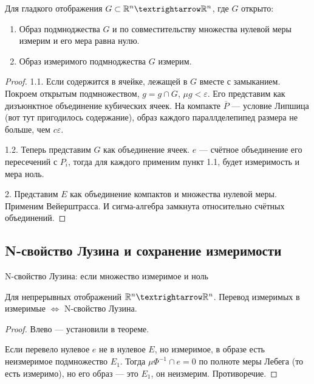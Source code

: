 \documentclass[12pt, a4paper, oneside]{memoir}
\begin{document}
\begin{theorem}

    Для гладкого отображения $G \subset \sR^n → \sR^n$, где $G$ открыто:

    \begin{enumerate}
        \item Образ подмноджества $G$ и по совместительству множества нулевой меры измерим и его мера равна нулю.
        \item Образ измеримого подмноджества $G$ измерим.
    \end{enumerate}

    \begin{proof}
        1.1. Если содержится в ячейке, лежащей в $G$ вместе с замыканием. Покроем открытым подмножеством, $g = g \cap G$,
         $\mu g < \varepsilon$. Его представим как дизъюнктное объединение кубических ячеек.
         На компакте $\overline{P}$ — условие Липшица (вот тут пригодилось содержание), образ каждого параллделепипед размера не больше, чем $c \varepsilon$.

        1.2. Теперь представим $G$ как объединение ячеек. $e$ — счётное объединение его пересечений с $P_i$,
        тогда для каждого применим пункт 1.1, будет измеримость и мера ноль.

        2. Представим $E$ как объединение компактов и множества нулевой меры. Применим Вейерштрасса.
        И сигма-алгебра замкнута относительно счётных объединений.
    \end{proof}
\end{theorem}

\subsection{N-свойство Лузина и сохранение измеримости}

N-свойство Лузина: если множество измеримое и ноль

\begin{theorem}
    Для непрерывных отображений $\sR^n → \sR^n$.
    Перевод измеримых в измеримые $\Leftrightarrow$ N-свойство Лузина.

    \begin{proof}
        Влево — установили в теореме.

        Если перевело нулевое $e$ не в нулевое $E$, но измеримое,
        в образе есть неизмеримое подмножество $E_1$.
        Тогда $\mu \Phi^{-1} \cap e = 0$ по полноте меры Лебега (то есть измеримо),
        но его образ — это $E_1$, он неизмерим.
        Противоречие.
    \end{proof}
\end{theorem}
\end{document}
